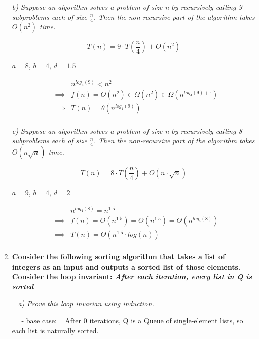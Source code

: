 \documentclass[12pt, letterpaper]{article}
\begin{document}
\begin{enumerate}
    \it{ b) Suppose an algorithm solves a problem of size n by recursively calling 9 subproblems each of size \(\frac{n}{4}\). Then the non-recursive part of the algorithm takes \(O(n^{2})\) time. }

    \[ T(n) = 9 \cdot T(\frac{n}{4}) + O(n^2) \]

    \textnormal{ \(a = 8\), \( b = 4 \), \(d = 1.5\) }

    \begin{eqnarray}
        && n^{log_4(9)} < n^{2} \\ 
        &\implies& f(n) = O(n^2) \in \Omega(n^2) \in \Omega(n^{log_4(9) + \epsilon }) \\
        &\implies& T(n) = \theta( n^{log_4(9)} ) \\
    \end{eqnarray}

    \it{ c) Suppose an algorithm solves a problem of size n by recursively calling 8 subproblems each of size \(\frac{n}{4}\). Then the non-recursive part of the algorithm takes \(O(n \sqrt{n})\) time. }

    \[ T(n) = 8 \cdot T(\frac{n}{4}) + O(n \cdot \sqrt{n}) \]

    \textnormal{ \(a = 9\), \( b = 4 \), \(d = 2\) }

    \begin{eqnarray}
        && n^{log_4(8)} = n^{1.5} \\ 
        &\implies& f(n) = O(n^{1.5}) = \Theta(n^{1.5}) = \Theta(n^{log_4(8)}) \\
        &\implies& T(n) = \Theta( n^{1.5} \cdot log(n) ) \\
    \end{eqnarray}


    \newpage
    \item 
    \bf{ Consider the following sorting algorithm that takes a list of integers as an input and outputs a sorted list of those elements. }
    \-\ \newline
    \-\ \newline
    \textnormal{Consider the loop invariant:} \it{After each iteration, every list in Q is sorted}

    \-\ \newline
    \it{ a) Prove this loop invarian using induction. }

    \-\ \newline
    \-\ - base case: 
    \-\ \textnormal{ After 0 iterations, Q is a Queue of single-element lists, so each list is naturally sorted. }


\end{enumerate}
\end{document}
